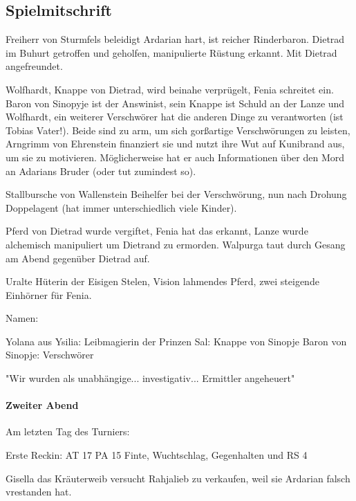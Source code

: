 \subsection{Spielmitschrift}

Freiherr von Sturmfels beleidigt Ardarian hart, ist reicher Rinderbaron. Dietrad im Buhurt getroffen und geholfen, manipulierte Rüstung erkannt. Mit Dietrad angefreundet.

Wolfhardt, Knappe von Dietrad, wird beinahe verprügelt, Fenia schreitet ein. Baron von Sinopyje ist der Answinist, sein Knappe ist Schuld an der Lanze und Wolfhardt, ein weiterer Verschwörer hat die anderen Dinge zu verantworten (ist Tobias Vater!). Beide sind zu arm, um sich gorßartige Verschwörungen zu leisten, Arngrimm von Ehrenstein finanziert sie und nutzt ihre Wut auf Kunibrand aus, um sie zu motivieren. Möglicherweise hat er auch Informationen über den Mord an Adarians Bruder (oder tut zumindest so).

Stallbursche von Wallenstein Beihelfer bei der Verschwörung, nun nach Drohung Doppelagent (hat immer unterschiedlich viele Kinder).

Pferd von Dietrad wurde vergiftet, Fenia hat das erkannt, Lanze wurde alchemisch manipuliert um Dietrand zu ermorden. Walpurga taut durch Gesang am Abend gegenüber Dietrad auf.

Uralte Hüterin der Eisigen Stelen, Vision lahmendes Pferd, zwei steigende Einhörner für Fenia.

Namen:

Yolana aus Ysilia: Leibmagierin der Prinzen
Sal: Knappe von Sinopje
Baron von Sinopje: Verschwörer

"Wir wurden als unabhängige... investigativ... Ermittler angeheuert"

\paragraph{Zweiter Abend} 
Am letzten Tag des Turniers: 

Erste Reckin: AT 17 PA 15 Finte, Wuchtschlag, Gegenhalten und RS 4

Gisella das Kräuterweib versucht Rahjalieb zu verkaufen, weil sie Ardarian falsch vrestanden hat.





